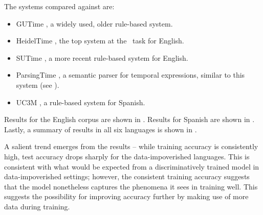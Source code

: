 The systems compared against are:
\begin{itemize}
\setlength{\itemsep}{0cm}
\item GUTime \cite{key:2000mani-temporal}, a widely used, older rule-based
              system.
\item HeidelTime \cite{key:2010strotgen-temporal}, the top
                 system at the \tempeval\ task for English.
\item SUTime \cite{key:2012chang-temporal}, a more recent rule-based
             system for English.
\item ParsingTime \mec, a semantic parser for temporal expressions, similar to
                  this system (see ).
\item UC3M \cite{2010vicente-uc3m}, a rule-based system for
             Spanish.
\end{itemize}

Results for the English corpus are shown in .
Results for Spanish are shown in .
Lastly, a summary of results in all six languages is shown in
  .

A salient trend emerges from the results -- while training accuracy is
  consistently high, test accuracy drops sharply for the data-impoverished
  languages.
This is consistent with what would be expected from a discriminatively trained
  model in data-impoverished settings; however, the consistent training accuracy
  suggests that the model nonetheless captures the phenomena it sees
  in training well.
This suggests the possibility for improving accuracy further by making use of
  more data during training.
